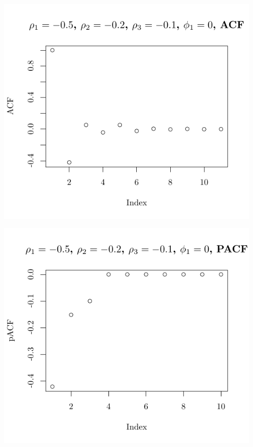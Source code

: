 \documentclass[10pt]{paper}\usepackage[]{graphicx}\usepackage[]{color}
\makeatletter
\def\maxwidth{ %
  \ifdim\Gin@nat@width>\linewidth
    \linewidth
  \else
    \Gin@nat@width
  \fi
}
\newenvironment{knitrout}{}{} %
\makeatother
\begin{document}
\begin{knitrout}
{\centering \includegraphics[width=\maxwidth]{figure/graphics-plotter-97} 

}




{\centering \includegraphics[width=\maxwidth]{figure/graphics-plotter-98} 

}





\end{knitrout}
\end{document}
